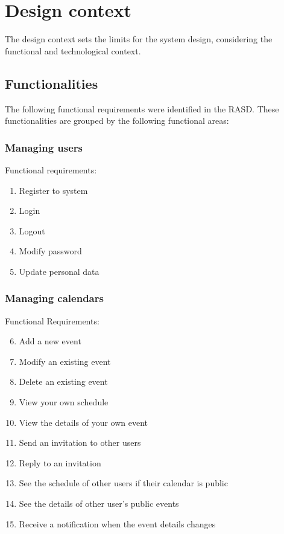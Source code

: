 \documentclass[10pt,a4paper,titlepage]{article}
\begin{document}
\section{Design context}
The design context sets the limits for the system design, considering the functional and technological context.

\subsection{Functionalities}
The following functional requirements were identified in the RASD. These functionalities are grouped by the following functional areas:

\subsubsection{Managing users}
Functional requirements:
\begin{enumerate}[label = FR \arabic*:]
\item Register to system
\item Login
\item Logout
\item Modify password
\item Update personal data
\end{enumerate}

\subsubsection{Managing calendars}
Functional Requirements:
\begin{enumerate}[label = FR \arabic*:]
\setcounter{enumi}{5}
\item Add a new event
\item Modify an existing event
\item Delete an existing event
\item View your own schedule 
\item View the details of your own event
\item Send an invitation to other users
\item Reply to an invitation
\item See the schedule of other users if their calendar is public
\item See the details of other user's public events
\item Receive a notification when the event details changes
\end{enumerate}
\end{document}
